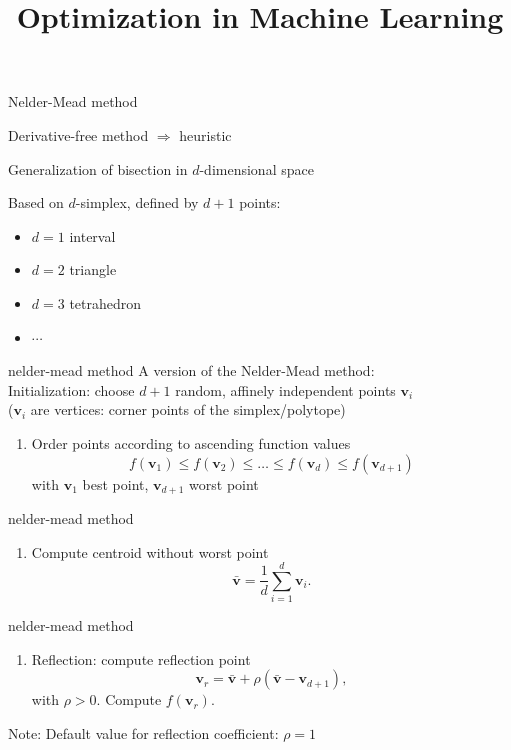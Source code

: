 \documentclass[11pt,compress,t,notes=noshow, xcolor=table]{beamer}
\title{Optimization in Machine Learning}
\newcommand{\vb}{\mathbf{v}}
\begin{document}

\begin{framei}{Nelder-Mead method}
\item Derivative-free method $\Rightarrow$ heuristic
\item Generalization of bisection in $d$-dimensional space
\item Based on $d$-simplex, defined by $d + 1$ points:
\begin{itemize}
\item $d = 1$ interval
\item $d = 2$ triangle
\item $d = 3$ tetrahedron
\item $\cdots$
\end{itemize}
\end{framei}


\begin{framev}{nelder-mead method}
A version of the Nelder-Mead method:\\
\spacer
Initialization: choose $d + 1$ random, affinely independent points $\vb_i$\\ ($\vb_i$ are vertices: corner points of the simplex/polytope)
\spacer
\begin{enumerate}
\item[1.] Order points according to ascending function values
$$f(\vb_1) \leq f(\vb_2) \leq \ldots \leq f(\vb_d) \leq f(\vb_{d + 1})$$
with $\vb_1$ best point, $\vb_{d + 1}$ worst point
\end{enumerate}
\end{framev}


\begin{framev}{nelder-mead method}
\begin{enumerate}
\item[2.] Compute centroid without worst point
$$\bar{\vb} = \frac{1}{d} \sum_{i = 1}^d \vb_i.$$
\end{enumerate}
\end{framev}


\begin{framev}{nelder-mead method}
\begin{enumerate}
\item[3.] Reflection: compute reflection point
$$\vb_r = \bar{\vb} + \rho (\bar{\vb} - \vb_{d + 1}),$$
with $\rho > 0$.
Compute $f(\vb_r)$.
\end{enumerate}
\spacer
Note: Default value for reflection coefficient: $\rho = 1$
\end{framev}
\end{document}
